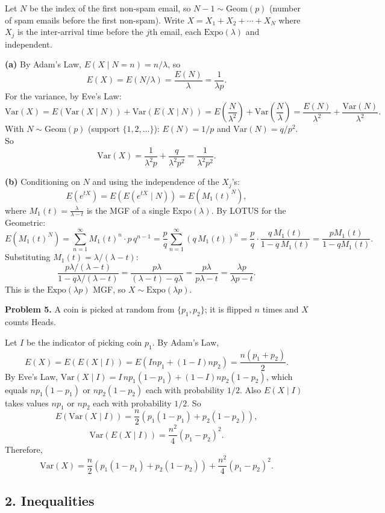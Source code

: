 \documentclass{article}
\begin{document}
Let $N$ be the index of the first non-spam email, so $N-1\sim\text{Geom}(p)$ (number of spam emails before the first non-spam). Write $X=X_1+X_2+\cdots+X_N$ where $X_j$ is the inter-arrival time before the $j$th email, each $\text{Expo}(\lambda)$ and independent.

\textbf{(a)} By Adam's Law, $E(X\mid N=n)=n/\lambda$, so
$$
E(X)=E(N/\lambda)=\frac{E(N)}{\lambda}=\frac{1}{\lambda p}.
$$
For the variance, by Eve's Law:
$$
\text{Var}(X)=E(\text{Var}(X\mid N))+\text{Var}(E(X\mid N))=E\!\left(\frac{N}{\lambda^2}\right)+\text{Var}\!\left(\frac{N}{\lambda}\right)=\frac{E(N)}{\lambda^2}+\frac{\text{Var}(N)}{\lambda^2}.
$$
With $N\sim\text{Geom}(p)$ (support $\{1,2,\dots\}$): $E(N)=1/p$ and $\text{Var}(N)=q/p^2$. So
$$
\text{Var}(X)=\frac{1}{\lambda^2 p}+\frac{q}{\lambda^2 p^2}=\frac{1}{\lambda^2 p^2}.
$$

\textbf{(b)} Conditioning on $N$ and using the independence of the $X_j$'s:
$$
E(e^{tX})=E\!\left(E(e^{tX}\mid N)\right)=E\!\left(M_1(t)^N\right),
$$
where $M_1(t)=\frac{\lambda}{\lambda-t}$ is the MGF of a single $\text{Expo}(\lambda)$. By LOTUS for the Geometric:
$$
E(M_1(t)^N)=\sum_{n=1}^\infty M_1(t)^n\cdot p\,q^{n-1}=\frac{p}{q}\sum_{n=1}^\infty(q\,M_1(t))^n=\frac{p}{q}\cdot\frac{q\,M_1(t)}{1-q\,M_1(t)}=\frac{p M_1(t)}{1-q M_1(t)}.
$$
Substituting $M_1(t)=\lambda/(\lambda-t)$:
$$
\frac{p\lambda/(\lambda-t)}{1-q\lambda/(\lambda-t)}=\frac{p\lambda}{(\lambda-t)-q\lambda}=\frac{p\lambda}{p\lambda-t}=\frac{\lambda p}{\lambda p-t}.
$$
This is the $\text{Expo}(\lambda p)$ MGF, so $X\sim\text{Expo}(\lambda p)$.

\bigskip
\textbf{Problem 5.} A coin is picked at random from $\{p_1,p_2\}$; it is flipped $n$ times and $X$ counts Heads.

Let $I$ be the indicator of picking coin $p_1$. By Adam's Law,
$$
E(X)=E(E(X\mid I))=E(Inp_1+(1-I)np_2)=\frac{n(p_1+p_2)}{2}.
$$
By Eve's Law, $\text{Var}(X\mid I)=I\,np_1(1-p_1)+(1-I)np_2(1-p_2)$, which equals $np_1(1-p_1)$ or $np_2(1-p_2)$ each with probability $1/2$. Also $E(X\mid I)$ takes values $np_1$ or $np_2$ each with probability $1/2$. So
$$
E(\text{Var}(X\mid I))=\frac{n}{2}(p_1(1-p_1)+p_2(1-p_2)),
$$
$$
\text{Var}(E(X\mid I))=\frac{n^2}{4}(p_1-p_2)^2.
$$
Therefore,
$$
\text{Var}(X)=\frac{n}{2}(p_1(1-p_1)+p_2(1-p_2))+\frac{n^2}{4}(p_1-p_2)^2.
$$

\subsection*{2. Inequalities}
\end{document}
